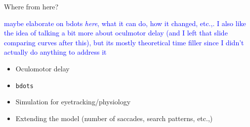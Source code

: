 \documentclass{beamer}
\newcommand{\xt}{\texttt}
\providecommand{\cn}[1]{\textcolor{blue}{#1}}
\begin{document}
\begin{frame}{Where from here?}

\cn{maybe elaborate on bdots \textit{here}, what it can do, how it changed, etc.,. I also like the idea of talking a bit more about oculmotor delay (and I left that slide comparing curves after this), but its mostly theoretical time filler since I didn't actually do anything to address it}

\begin{itemize}
\item Oculomotor delay
\item \xt{bdots}
\item Simulation for eyetracking/physiology
\item Extending the model (number of saccades, search patterns, etc.,)
\end{itemize}
\end{frame}
%
%
%
%
%
%
%
\end{document}

